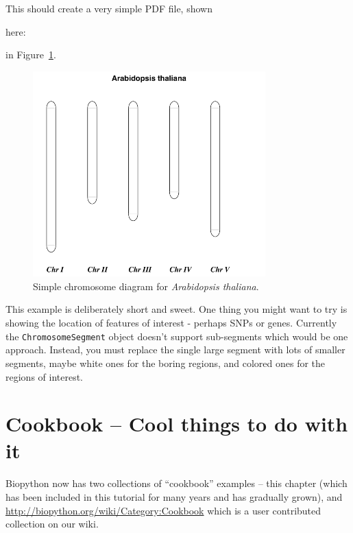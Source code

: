 \documentclass{report}
\begin{document}
This should create a very simple PDF file, shown
\begin{htmlonly}
here:


\end{htmlonly}
\begin{latexonly}
in Figure~\ref{fig:simplechromosome}.
\begin{figure}[htbp]
\centering
\includegraphics[width=0.8\textwidth]{images/simple_chrom.png}
\caption{Simple chromosome diagram for \textit{Arabidopsis thaliana}.}
\label{fig:simplechromosome}
\end{figure}
\end{latexonly}
This example is deliberately short and sweet. One thing you might want to try is
showing the location of features of interest - perhaps SNPs or genes.  Currently
the \verb|ChromosomeSegment| object doesn't support sub-segments which would be
one approach.  Instead, you must replace the single large segment with lots of
smaller segments, maybe white ones for the boring regions, and colored ones for
the regions of interest.

\chapter{Cookbook -- Cool things to do with it}
\label{chapter:cookbook}

Biopython now has two collections of ``cookbook'' examples -- this chapter
(which has been included in this tutorial for many years and has gradually
grown), and \url{http://biopython.org/wiki/Category:Cookbook} which is a
user contributed collection on our wiki.
\end{document}
